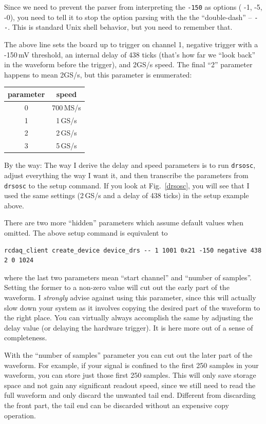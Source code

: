 \documentclass{article}[11pt]
\begin{document}
Since we need to prevent the parser from interpreting the \verb|-150|
as options ( -1, -5, -0), you need to tell it to stop the option
parsing with the the ``double-dash'' -- \verb|--|. This is standard
Unix shell behavior, but you need to remember that.

The above line sets the board up to trigger on channel 1, negative trigger
with a -150\,mV threshold, an internal delay of 438 ticks (that's how
far we ``look back'' in the waveform before the trigger), and 2GS/s
speed. The final ``2'' parameter happens to mean 2GS/s, but this
parameter is enumerated:

\begin{center}
\begin{tabular}{|c|c|}
\hline
parameter & speed \\
\hline
\hline
    0 & 700\,MS/s  \\ \hline
    1 & 1\,GS/s   \\ \hline
    2 & 2\,GS/s   \\ \hline
    3 & 5\,GS/s   \\ \hline
\end{tabular}
\end{center}

By the way: The way I derive the delay and speed parameters is to run
\verb|drsosc|, adjust everything the way I want it, and then
transcribe the parameters from \verb|drsosc| to the setup command. If
you look at Fig.~\ref{drsosc}, you will see that I used the same
settings (2\,GS/s and a delay of 438 ticks) in the setup example
above.

There are two more ``hidden'' parameters which assume default values
when omitted.  The above setup command is equivalent to

\begin{verbatim}
rcdaq_client create_device device_drs -- 1 1001 0x21 -150 negative 438 2 0 1024
\end{verbatim}

where the last two parameters mean ``start channel'' and ``number of
samples''. Setting the former to a non-zero value will cut out the
early part of the waveform. I \emph{strongly} advise against using
this parameter, since this will actually slow down your system as it
involves copying the desired part of the waveform to the right place.
You can virtually always accomplish the same by adjusting the delay
value (or delaying the hardware trigger). It is here more
out of a sense of completeness.

With the ``number of samples'' parameter you can cut out the later
part of the waveform. For example, if your signal is confined to the
first 250 samples in your waveform, you can store just those first 250
samples. This will only save storage space and not gain any
significant readout speed, since we still need to read the full
waveform and only discard the unwanted tail end. Different from
discarding the front part, the tail end can be discarded without an
expensive copy operation.
\end{document}
